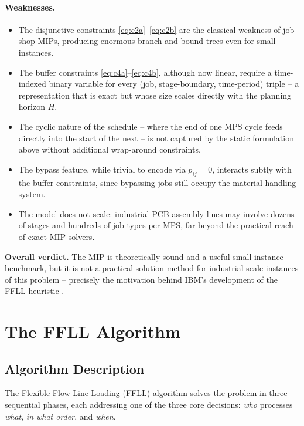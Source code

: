 \documentclass[11pt,a4paper]{article}
\begin{document}
\paragraph{Weaknesses.}
\begin{itemize}
  \item The disjunctive constraints \eqref{eq:c2a}--\eqref{eq:c2b} are the
    classical weakness of job-shop MIPs, producing enormous branch-and-bound
    trees even for small instances.
  \item The buffer constraints \eqref{eq:c4a}--\eqref{eq:c4b}, although now
    linear, require a time-indexed binary variable for every
    (job, stage-boundary, time-period) triple -- a representation that is
    exact but whose size scales directly with the planning horizon $H$.
  \item The cyclic nature of the schedule -- where the end of one MPS
    cycle feeds directly into the start of the next -- is not captured by
    the static formulation above without additional wrap-around
    constraints.
  \item The bypass feature, while trivial to encode via $p_{ij}=0$,
    interacts subtly with the buffer constraints, since bypassing jobs
    still occupy the material handling system.
  \item The model does not scale: industrial PCB assembly lines may involve
    dozens of stages and hundreds of job types per MPS, far beyond the
    practical reach of exact MIP solvers.
\end{itemize}

\noindent \textbf{Overall verdict.} The MIP is theoretically sound and a
useful small-instance benchmark, but it is not a practical solution method
for industrial-scale instances of this problem -- precisely the motivation
behind IBM's development of the FFLL heuristic \citep{ibm_ffll}.

\section{The FFLL Algorithm}

\subsection{Algorithm Description}

The Flexible Flow Line Loading (FFLL) algorithm \citep{ibm_ffll,
pinedo2016scheduling} solves the problem in three sequential phases, each
addressing one of the three core decisions: \emph{who} processes \emph{what},
\emph{in what order}, and \emph{when}.
\end{document}
